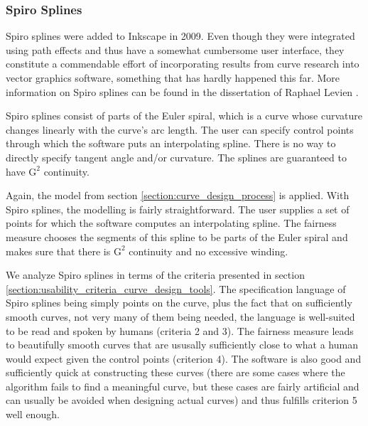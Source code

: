 \documentclass[a4paper]{article}
\begin{document}
			\subsubsection{Spiro Splines}
			\label{section:spiro_splines}

				Spiro splines were added to Inkscape in 2009. Even though they were integrated using path effects and thus have a somewhat cumbersome user interface, they constitute a commendable effort of incorporating results from curve research into vector graphics software, something that has hardly happened this far. More information on Spiro splines can be found in the dissertation of Raphael Levien \cite{Levien2009}.

				Spiro splines consist of parts of the Euler spiral, which is a curve whose curvature changes linearly with the curve's arc length. The user can specify control points through which the software puts an interpolating spline. There is no way to directly specify tangent angle and/or curvature. The splines are guaranteed to have \(\mathrm{G}^2\) continuity.

				Again, the model from section \ref{section:curve_design_process} is applied. With Spiro splines, the modelling is fairly straightforward. The user supplies a set of points for which the software computes an interpolating spline. The fairness measure chooses the segments of this spline to be parts of the Euler spiral and makes sure that there is \(\mathrm{G}^2\) continuity and no excessive winding.

				We analyze Spiro splines in terms of the criteria presented in section \ref{section:usability_criteria_curve_design_tools}. The specification language of Spiro splines being simply points on the curve, plus the fact that on sufficiently smooth curves, not very many of them being needed, the language is well-suited to be read and spoken by humans (criteria 2 and 3). The fairness measure leads to beautifully smooth curves that are ususally sufficiently close to what a human would expect given the control points (criterion 4). The software is also good and sufficiently quick at constructing these curves (there are some cases where the algorithm fails to find a meaningful curve, but these cases are fairly artificial and can usually be avoided when designing actual curves) and thus fulfills criterion 5 well enough.
\end{document}
